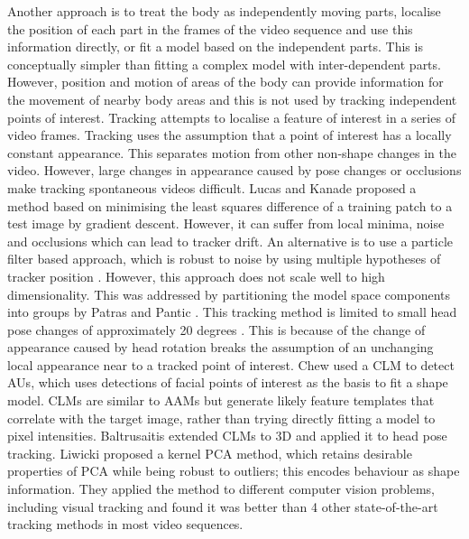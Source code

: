Another approach is to treat the body as independently moving parts, localise the position of each part in the frames of the video sequence and use this information directly, or fit a model based on the independent parts. This is conceptually simpler than fitting a complex model with inter-dependent parts. However, position and motion of areas of the body can provide information for the movement of nearby body areas and this is not used by tracking independent points of interest. Tracking attempts to localise a feature of interest in a series of video frames. Tracking uses the assumption that a point of interest has a locally constant appearance. This separates motion from other non-shape changes in the video. However, large changes in appearance caused by pose changes or occlusions make tracking spontaneous videos difficult. Lucas and Kanade  \cite{Lucas1981} proposed a method based on minimising the least squares difference of a training patch to a test image by gradient descent. However, it can suffer from local minima, noise and occlusions which can lead to tracker drift. An alternative is to use a particle filter based approach, which is robust to noise by using multiple hypotheses of tracker position \cite{Isard1998}. However, this approach does not scale well to high dimensionality. This was addressed by partitioning the model space components into groups by Patras and Pantic \cite{Patras2004}. This tracking method is limited to small head pose changes of approximately 20 degrees \cite{Valstar2012}. This is because of the change of appearance caused by head rotation breaks the assumption of an unchanging local appearance near to a tracked point of interest. Chew \etal \cite{Chew2012} used a \ac{CLM} to detect \ac{AU}s, which uses detections of facial points of interest as the basis to fit a shape model. \ac{CLM}s \cite{Cristinacce2008} are similar to \ac{AAM}s but generate likely feature templates that correlate with the target image, rather than trying directly fitting a model to pixel intensities. Baltrusaitis \etal \cite{Baltrusaitis2012} extended \ac{CLM}s to {3D} and applied it to head pose tracking. Liwicki \etal \cite{Liwicki2012, Liwicki2012b} proposed a kernel \ac{PCA} method, which retains desirable properties of \ac{PCA} while being robust to outliers; this encodes behaviour as shape information. They applied the method to different computer vision problems, including visual tracking and found it was better than 4 other state-of-the-art tracking methods in most video sequences.


